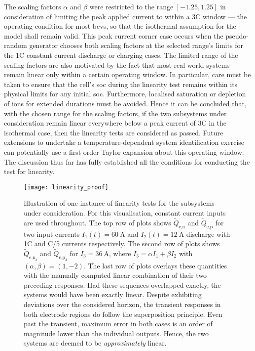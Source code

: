 The  scaling  factors  $\alpha$  and   $\beta$  were  restricted  to  the  range
$[-1.25,1.25]$ in consideration of limiting the peak applied current to within a
\pm 3C  window ---  the operating  condition for most  \glspl{bev}, so  that the
isothermal assumption for the model shall remain valid. This peak current corner
case occurs when the pseudo-random generator chooses both scaling factors at the
selected range's limits for the 1C constant current discharge or charging cases.
The limited  range of the  scaling factors are also  motivated by the  fact that
most real-world systems remain linear only within a certain operating window. In
particular, care  must be taken to  ensure that the cell's  \gls{soc} during the
linearity test  remains within  its physical limits  for any  initial \gls{soc}.
Furthermore, localised  saturation or depletion  of ions for  extended durations
must be avoided. Hence  it can be concluded that, with the  chosen range for the
scaling  factors,  if  the  two subsystems  under  consideration  remain  linear
everywhere below  a peak  current of  \pm 3C  in the  isothermal case,  then the
linearity  tests are  considered as  passed.  Future extensions  to undertake  a
temperature-dependent  system  identification  exercise can  potentially  use  a
first-order Taylor  expansion about this  operating window. The  discussion thus
far  has fully  established  all  the conditions  for  conducting  the test  for
linearity.

\begin{figure}[!htb]
    \centering
    \texttt{[image: linearity\_proof]}
    \caption[Illustration of linearity test for the
     and
     subsystems]{Illustration of one
        instance of linearity tests for the subsystems under consideration. For
        this visualisation, constant current inputs are used throughout. The top
        row of plots shows $\widetilde{Q}_{\text{e,n}}$ and
        $\widetilde{Q}_{\text{e,p}}$ for two input currents $I_1(t) =
        \SI{60}{\ampere}$ and $I_2(t) = \SI{12}{\ampere}$ \ie{} discharge with
        1C and C/5 currents respectively. The second row of plots shows
        $\widetilde{Q}_{\text{e,n}_3}$ and $\widetilde{Q}_{\text{e,p}_3}$  for
        $I_3 = \SI{36}{\ampere}$, where $I_3 = \alpha I_1 + \beta I_2$ with
        $(\alpha,\beta) = (1,-2)$. The last row of plots overlays these
        quantities with the manually computed linear combination of their two
        preceding responses. Had these sequences overlapped exactly, the systems
        would have been exactly linear. Despite exhibiting deviations over the
        considered horizon, the transient responses in both electrode regions do
        follow the superposition principle. Even past the transient, maximum
        error in both cases is an order of magnitude lower than the individual
        outputs. Hence, the two systems are deemed to be \emph{approximately}
        linear.
    }%
    \label{fig:linearity}
\end{figure}

